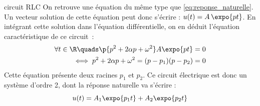 \begin{exemple}{circuit RLC}
          On retrouve une équation du même type que
          \ref{eq:reponse_naturelle}. Un vecteur solution de cette
          équation peut donc s'écrire : $u(t) = A\,\expo{pt}$. En intégrant
          cette solution dans l'équation différentielle, on en déduit
          l'équation caractéristique de ce circuit~:
          \begin{eqnarray}
            \label{eq:carac_RLC}
            \forall t\in\R\quads \p{p^{2}+2\alpha p+\omega^{2}}A\expo{pt}=0 \nonumber\\
            \iff  p^{2}+2\alpha p+\omega^{2}=(p-p_{1})(p-p_{2})=0
          \end{eqnarray}
          Cette équation présente deux racines $p_{1}$ et $p_{2}$. Ce
          circuit électrique est donc un système d'ordre 2, dont la
          réponse naturelle va s'écrire :
          \begin{equation}\label{key}
            u(t) = A_{1}\expo{p_{1}t}+A_{2}\expo{p_{2}t}
          \end{equation}
          

\end{exemple}
